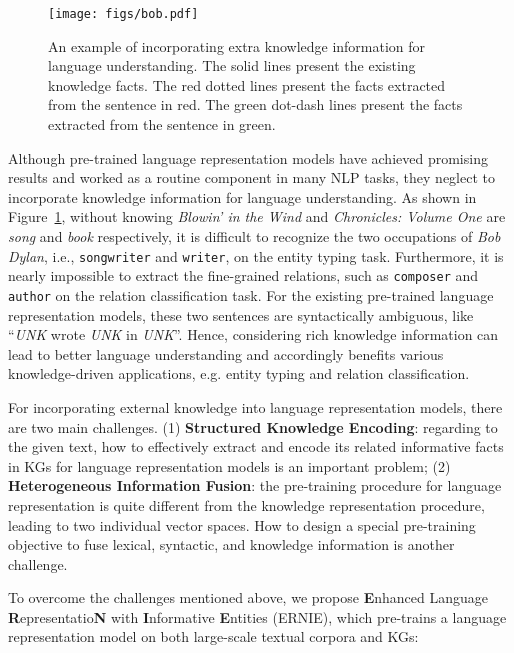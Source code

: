 \documentclass[11pt,a4paper]{article}
\begin{document}
\begin{figure}[t]
\centering
\texttt{[image: figs/bob.pdf]}
\caption{An example of incorporating extra knowledge information for language understanding. The solid lines present the existing knowledge facts. The red dotted lines present the facts extracted from the sentence in red. The green dot-dash lines present the facts extracted from the sentence in green.} \label{fig:bob}
\vspace{-5.1mm}
\end{figure}

Although pre-trained language representation models have achieved promising results and worked as a routine component in many NLP tasks, they neglect to incorporate knowledge information for language understanding. As shown in Figure~\ref{fig:bob}, without knowing \emph{Blowin' in the Wind} and \emph{Chronicles: Volume One} are \emph{song} and \emph{book} respectively, it is difficult to recognize the two occupations of \emph{Bob Dylan}, i.e., \texttt{songwriter} and \texttt{writer}, on the entity typing task. Furthermore, it is nearly impossible to extract the fine-grained relations, such as \texttt{composer} and \texttt{author} on the relation classification task. For the existing pre-trained language representation models, these two sentences are syntactically ambiguous, like ``\emph{UNK} wrote \emph{UNK} in \emph{UNK}''. Hence, considering rich knowledge information can lead to better language understanding and accordingly benefits various knowledge-driven applications, e.g. entity typing and relation classification.

For incorporating external knowledge into language representation models, there are two main challenges. (1) \textbf{Structured Knowledge Encoding}: regarding to the given text, how to effectively extract and encode its related informative facts in KGs for language representation models is an important problem; (2) \textbf{Heterogeneous Information Fusion}: the pre-training procedure for language representation is quite different from the knowledge representation procedure, leading to two individual vector spaces. How to design a special pre-training objective to fuse lexical, syntactic, and knowledge information is another challenge.

To overcome the challenges mentioned above, we propose \textbf{E}nhanced Language \textbf{R}epresentatio\textbf{N} with \textbf{I}nformative \textbf{E}ntities (ERNIE), which pre-trains a language representation model on both large-scale textual corpora and KGs: 
\end{document}

